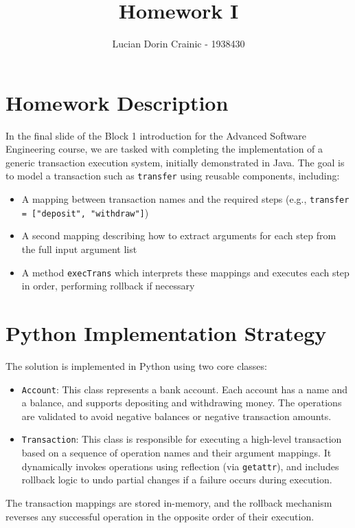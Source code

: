 \documentclass[a4paper,12pt]{article}
\title{Homework I}
\author{Lucian Dorin Crainic - 1938430}
\date{}
\begin{document}
\maketitle

\section*{Homework Description}

In the final slide of the Block 1 introduction for the Advanced Software Engineering course, we are tasked with completing the implementation of a generic transaction execution system, initially demonstrated in Java. The goal is to model a transaction such as \texttt{transfer} using reusable components, including:

\begin{itemize}
  \item A mapping between transaction names and the required steps (e.g., \texttt{transfer = ["deposit", "withdraw"]})
  \item A second mapping describing how to extract arguments for each step from the full input argument list
  \item A method \texttt{execTrans} which interprets these mappings and executes each step in order, performing rollback if necessary
\end{itemize}

\section*{Python Implementation Strategy}

The solution is implemented in Python using two core classes:

\begin{itemize}
  \item \texttt{Account}: This class represents a bank account. Each account has a name and a balance, and supports depositing and withdrawing money. The operations are validated to avoid negative balances or negative transaction amounts.
  \item \texttt{Transaction}: This class is responsible for executing a high-level transaction based on a sequence of operation names and their argument mappings. It dynamically invokes operations using reflection (via \texttt{getattr}), and includes rollback logic to undo partial changes if a failure occurs during execution.
\end{itemize}

The transaction mappings are stored in-memory, and the rollback mechanism reverses any successful operation in the opposite order of their execution.
\end{document}
